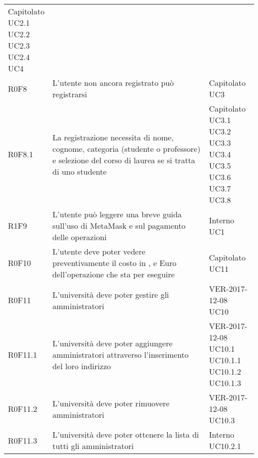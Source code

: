 \documentclass[AnalisiDeiRequisiti.tex]{subfiles}
\begin{document}
\begin{longtable}[H]{p{2cm}p{5.2cm}p{5cm}}
{		Capitolato \\ 
		UC2.1  \\
		UC2.2 \\
		UC2.3 \\
		UC2.4 \\ 
		UC4
	} \\
	R0F8 & L'utente non ancora registrato può registrarsi & \makecell[tl]{
		Capitolato \\ 
		UC3
	} \\
	R0F8.1 & La registrazione necessita di nome, cognome, categoria (studente o professore) e selezione del corso di laurea se si tratta di uno studente & \makecell[tl]{
		Capitolato \\
		UC3.1 \\
		UC3.2 \\
		UC3.3 \\
		UC3.4 \\
		UC3.5 \\
		UC3.6 \\
		UC3.7 \\
		UC3.8
	} \\
	R1F9 & L'utente può leggere una breve guida sull'uso di MetaMask e sul pagamento delle operazioni & \makecell[tl]{
		Interno \\ 
		UC1
	} \\
	R0F10 & L'utente deve poter vedere preventivamente il costo in \citGloss{Gas}, \citGloss{Ether} e Euro dell'operazione che sta per eseguire & \makecell[tl]{
		Capitolato \\
		UC11
	} \\
	R0F11 & L'università deve poter gestire gli amministratori & \makecell[tl]{
		VER-2017-12-08 \\
		UC10
	} \\
	R0F11.1 & L'università deve poter aggiungere amministratori attraverso l'inserimento del loro indirizzo & \makecell[tl]{
		VER-2017-12-08 \\
		UC10.1 \\
		UC10.1.1 \\ 
		UC10.1.2 \\
		UC10.1.3
	} \\
	R0F11.2 & L'università deve poter rimuovere amministratori & \makecell[tl]{
		VER-2017-12-08 \\
		UC10.3
	} \\
	R0F11.3 & L'università deve poter ottenere la lista di tutti gli amministratori & \makecell[tl]{
		Interno \\
		UC10.2.1
	} \\

\end{longtable}
\end{document}
